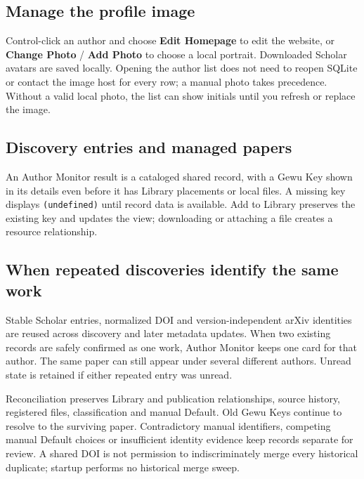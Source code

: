 \documentclass[10pt,letterpaper,oneside]{scrreprt}
\begin{document}
\subsection{Manage the profile image}\label{manage-the-profile-image}

Control-click an author and choose \textbf{Edit Homepage} to edit the website, or \textbf{Change Photo} / \textbf{Add Photo} to choose a local portrait. Downloaded Scholar avatars are saved locally. Opening the author list does not need to reopen SQLite or contact the image host for every row; a manual photo takes precedence. Without a valid local photo, the list can show initials until you refresh or replace the image.

\subsection{Discovery entries and managed papers}\label{discovery-entries-and-managed-papers}

An Author Monitor result is a cataloged shared record, with a Gewu Key shown in its details even before it has Library placements or local files. A missing key displays \texttt{(undefined)} until record data is available. Add to Library preserves the existing key and updates the view; downloading or attaching a file creates a resource relationship.

\subsection{When repeated discoveries identify the same work}\label{when-repeated-discoveries-identify-the-same-work}

Stable Scholar entries, normalized DOI and version-independent arXiv identities are reused across discovery and later metadata updates. When two existing records are safely confirmed as one work, Author Monitor keeps one card for that author. The same paper can still appear under several different authors. Unread state is retained if either repeated entry was unread.

Reconciliation preserves Library and publication relationships, source history, registered files, classification and manual Default. Old Gewu Keys continue to resolve to the surviving paper. Contradictory manual identifiers, competing manual Default choices or insufficient identity evidence keep records separate for review. A shared DOI is not permission to indiscriminately merge every historical duplicate; startup performs no historical merge sweep.
\end{document}
